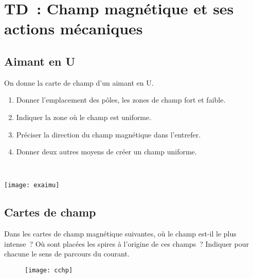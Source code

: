 \documentclass[a4paper, 10pt, final, garamond]{book}
\begin{document}

\chapter{TD~: Champ magnétique et ses actions mécaniques}

\section{Aimant en U}
\label{sec:exaimu}
\noindent
\begin{minipage}[t]{.5\linewidth}
  On donne la carte de champ d'un aimant en U.
  \bigbreak
  \begin{enumerate}
    \item Donner l'emplacement des pôles, les zones de champ fort et faible.
    \item Indiquer la zone où le champ est uniforme.
    \item Préciser la direction du champ magnétique dans l'entrefer.
    \item Donner deux autres moyens de créer un champ uniforme.
  \end{enumerate}
\end{minipage}
\begin{minipage}[t]{.5\linewidth}
  ~
  \vspace*{-10pt}
  \begin{center}
    \texttt{[image: exaimu]}
    \label{fig:exaimu}
  \end{center}
\end{minipage}

\section{Cartes de champ}
\label{sec:excchp}
Dans les cartes de champ magnétique suivantes, où le champ est-il le plus
intense~? Où sont placées les spires à l'origine de ces champs~? Indiquer pour
chacune le sens de parcours du courant.
\begin{figure}[h]
  \centering
  \texttt{[image: cchp]}
  \label{fig:excchp}
\end{figure}
\end{document}
